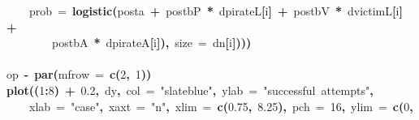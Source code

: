 \documentclass{article}
\makeatletter
\newcommand{\hlnumber}[1]{\textcolor[rgb]{0,0,0}{#1}}%
\newcommand{\hlfunctioncall}[1]{\textcolor[rgb]{.5,0,.33}{\textbf{#1}}}%
\newcommand{\hlstring}[1]{\textcolor[rgb]{.6,.6,1}{#1}}%
\newcommand{\hlkeyword}[1]{\textbf{#1}}%
\newcommand{\hlargument}[1]{\textcolor[rgb]{.69,.25,.02}{#1}}%
\newcommand{\hlassignement}[1]{\textbf{#1}}%
\newcommand{\hlsymbol}[1]{#1}%
\newcommand{\hlstd}[1]{\textcolor[rgb]{0,0,0}{#1}}%
\newenvironment{kframe}{%
 \def\FrameCommand##1{\hskip\@totalleftmargin \hskip-\fboxsep
 \colorbox{shadecolor}{##1}\hskip-\fboxsep
     \hskip-\linewidth \hskip-\@totalleftmargin \hskip\columnwidth}%
 \MakeFramed {\advance\hsize-\width
   \@totalleftmargin\z@ \linewidth\hsize
   \@setminipage}}%
 {\par\unskip\endMakeFramed}
\newenvironment{knitrout}{}{} %
\makeatother
\begin{document}
\begin{knitrout}
{\begin{kframe}
\begin{flushleft}
\hlstd{}{\ }{\ }{\ }{\ }\hlargument{prob}{\ }\hlargument{=}{\ }\hlfunctioncall{logistic}\hlkeyword{(}\hlsymbol{post}\hlkeyword{\usebox{\hlnormalsizeboxdollar}}\hlsymbol{a}{\ }\hlkeyword{+}{\ }\hlsymbol{post}\hlkeyword{\usebox{\hlnormalsizeboxdollar}}\hlsymbol{bP}{\ }\hlkeyword{*}{\ }\hlsymbol{d}\hlkeyword{\usebox{\hlnormalsizeboxdollar}}\hlsymbol{pirateL}\hlkeyword{[}\hlsymbol{i}\hlkeyword{]}{\ }\hlkeyword{+}{\ }\hlsymbol{post}\hlkeyword{\usebox{\hlnormalsizeboxdollar}}\hlsymbol{bV}{\ }\hlkeyword{*}{\ }\hlsymbol{d}\hlkeyword{\usebox{\hlnormalsizeboxdollar}}\hlsymbol{victimL}\hlkeyword{[}\hlsymbol{i}\hlkeyword{]}{\ }\hlkeyword{+}\hspace*{\fill}\\
\hlstd{}{\ }{\ }{\ }{\ }{\ }{\ }{\ }{\ }\hlsymbol{post}\hlkeyword{\usebox{\hlnormalsizeboxdollar}}\hlsymbol{bA}{\ }\hlkeyword{*}{\ }\hlsymbol{d}\hlkeyword{\usebox{\hlnormalsizeboxdollar}}\hlsymbol{pirateA}\hlkeyword{[}\hlsymbol{i}\hlkeyword{]}\hlkeyword{)}\hlkeyword{,}{\ }\hlargument{size}{\ }\hlargument{=}{\ }\hlsymbol{d}\hlkeyword{\usebox{\hlnormalsizeboxdollar}}\hlsymbol{n}\hlkeyword{[}\hlsymbol{i}\hlkeyword{]}\hlkeyword{)}\hlkeyword{)}\hlkeyword{)}\hspace*{\fill}\\
\hlstd{}\hspace*{\fill}\\
\hlstd{}\hlsymbol{op}{\ }\hlassignement{\usebox{\hlnormalsizeboxlessthan}-}{\ }\hlfunctioncall{par}\hlkeyword{(}\hlargument{mfrow}{\ }\hlargument{=}{\ }\hlfunctioncall{c}\hlkeyword{(}\hlnumber{2}\hlkeyword{,}{\ }\hlnumber{1}\hlkeyword{)}\hlkeyword{)}\hspace*{\fill}\\
\hlstd{}\hlfunctioncall{plot}\hlkeyword{(}\hlkeyword{(}\hlnumber{1}\hlkeyword{:}\hlnumber{8}\hlkeyword{)}{\ }\hlkeyword{+}{\ }\hlnumber{0.2}\hlkeyword{,}{\ }\hlsymbol{d}\hlkeyword{\usebox{\hlnormalsizeboxdollar}}\hlsymbol{y}\hlkeyword{,}{\ }\hlargument{col}{\ }\hlargument{=}{\ }\hlstring{"slateblue"}\hlkeyword{,}{\ }\hlargument{ylab}{\ }\hlargument{=}{\ }\hlstring{"successful{\ }attempts"}\hlkeyword{,}\hspace*{\fill}\\
\hlstd{}{\ }{\ }{\ }{\ }\hlargument{xlab}{\ }\hlargument{=}{\ }\hlstring{"case"}\hlkeyword{,}{\ }\hlargument{xaxt}{\ }\hlargument{=}{\ }\hlstring{"n"}\hlkeyword{,}{\ }\hlargument{xlim}{\ }\hlargument{=}{\ }\hlfunctioncall{c}\hlkeyword{(}\hlnumber{0.75}\hlkeyword{,}{\ }\hlnumber{8.25}\hlkeyword{)}\hlkeyword{,}{\ }\hlargument{pch}{\ }\hlargument{=}{\ }\hlnumber{16}\hlkeyword{,}{\ }\hlargument{ylim}{\ }\hlargument{=}{\ }\hlfunctioncall{c}\hlkeyword{(}\hlnumber{0}\hlkeyword{,}\hspace*{\fill}\\

\end{flushleft}
\end{kframe}}
\end{knitrout}
\end{document}
